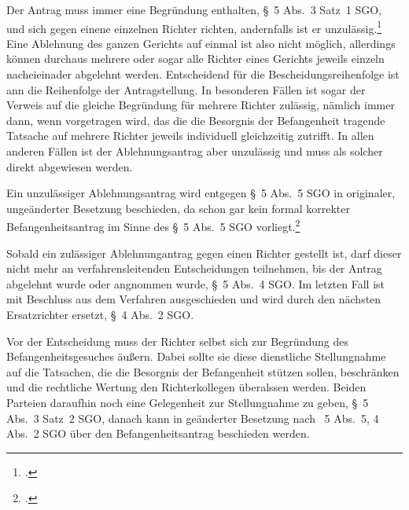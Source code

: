 Der Antrag muss immer eine Begründung enthalten, \S~5 Abs.~3 Satz~1 SGO, und sich gegen einene einzelnen Richter richten, andernfalls ist er unzulässig.\footnote{\cites[S.~1]{BSG201305062BefangenheitI}{BGHIIARZ101}.}
Eine Ablehnung des ganzen Gerichts auf einmal ist also nicht möglich, allerdings können durchaus mehrere oder sogar alle Richter eines Gerichts jeweils einzeln nacheieinader abgelehnt werden.
Entscheidend für die Bescheidungsreihenfolge ist ann die Reihenfolge der Antragstellung.
In besonderen Fällen ist sogar der Verweis auf die gleiche Begründung für mehrere Richter zulässig, nämlich immer dann, wenn vorgetragen wird, das die die Besorgnis der Befangenheit tragende Tatsache auf mehrere Richter jeweils individuell gleichzeitig zutrifft.
In allen anderen Fällen ist der Ablehnungsantrag aber unzulässig und muss als solcher direkt abgewiesen werden.

Ein unzulässiger Ablehnungsantrag wird entgegen \S~5 Abs.~5 SGO in originaler, ungeänderter Besetzung beschieden, da schon gar kein formal korrekter Befangenheitsantrag im Sinne des \S~5 Abs.~5 SGO vorliegt.\footnote{\cites[S.~1]{BSG201305062BefangenheitI}{BSG201305062BefangenheitII}.}

Sobald ein zulässiger Ablehnungantrag gegen einen Richter gestellt ist, darf dieser nicht mehr an verfahrensleitenden Entscheidungen teilnehmen, bis der Antrag abgelehnt wurde oder angnommen wurde, \S~5 Abs.~4 SGO.
Im letzten Fall ist mit Beschluss aus dem Verfahren ausgeschieden und wird durch den nächsten Ersatzrichter ersetzt, \S~4 Abs.~2 SGO.

Vor der Entscheidung muss der Richter selbst sich zur Begründung des Befangenheitsgesuches äußern.
Dabei sollte sie diese dienstliche Stellungnahme auf die Tatsachen, die die Besorgnis der Befangenheit stützen sollen, beschränken und die rechtliche Wertung den Richterkollegen überalssen werden.
Beiden Parteien daraufhin noch eine Gelegenheit zur Stellungnahme zu geben, \S~5 Abs.~3 Satz~2 SGO, danach kann in geänderter Besetzung nach \SSS~5 Abs.~5, 4 Abs.~2 SGO über den Befangenheitsantrag beschieden werden.

